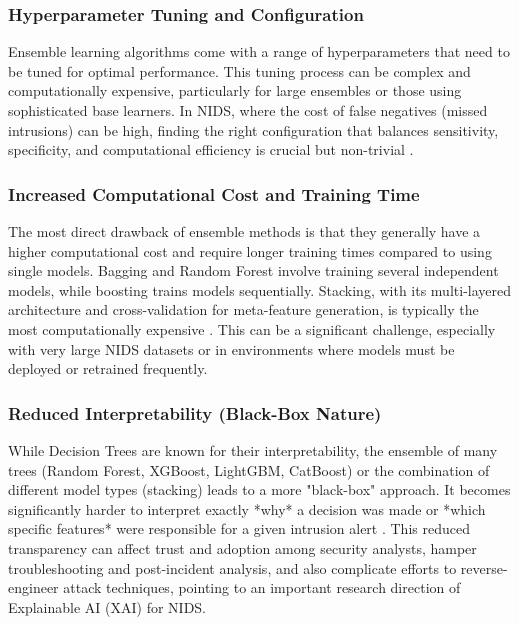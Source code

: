 \subsubsection{Hyperparameter Tuning and Configuration} 
Ensemble learning algorithms come with a range of hyperparameters that need to be tuned for optimal performance. This tuning process can be complex and computationally expensive, particularly for large ensembles or those using sophisticated base learners. In NIDS, where the cost of false negatives (missed intrusions) can be high, finding the right configuration that balances sensitivity, specificity, and computational efficiency is crucial but non-trivial \parencite{li2022challenges}.

\subsubsection{Increased Computational Cost and Training Time} 
The most direct drawback of ensemble methods is that they generally have a higher computational cost and require longer training times compared to using single models. Bagging and Random Forest involve training several independent models, while boosting trains models sequentially. Stacking, with its multi-layered architecture and cross-validation for meta-feature generation, is typically the most computationally expensive \parencite{aldhubaib2024network}. This can be a significant challenge, especially with very large NIDS datasets or in environments where models must be deployed or retrained frequently.

\subsubsection{Reduced Interpretability (Black-Box Nature)} 
While Decision Trees are known for their interpretability, the ensemble of many trees (Random Forest, XGBoost, LightGBM, CatBoost) or the combination of different model types (stacking) leads to a more "black-box" approach. It becomes significantly harder to interpret exactly *why* a decision was made or *which specific features* were responsible for a given intrusion alert \parencite{kasongo2021improving}. This reduced transparency can affect trust and adoption among security analysts, hamper troubleshooting and post-incident analysis, and also complicate efforts to reverse-engineer attack techniques, pointing to an important research direction of Explainable AI (XAI) for NIDS.

